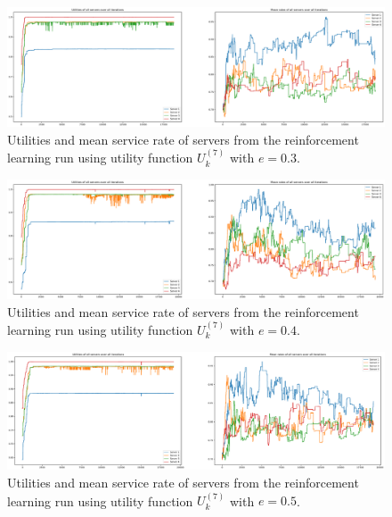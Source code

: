 \begin{figure}[H]
    \includegraphics[width=\textwidth]{chapters/00_appendix/03_more_rl_results/Bin/utility_7_eps/u7_1_e03.eps}
    \caption{Utilities and mean service rate of servers from the reinforcement
    learning run using utility function \(U_k^{(7)}\) with \(e = 0.3\).}
    \label{fig:RL_utility7_1_e03}
\end{figure}


\begin{figure}[H]
    \includegraphics[width=\textwidth]{chapters/00_appendix/03_more_rl_results/Bin/utility_7_eps/u7_1_e04.eps}
    \caption{Utilities and mean service rate of servers from the reinforcement
    learning run using utility function \(U_k^{(7)}\) with \(e = 0.4\).}
    \label{fig:RL_utility7_1_e04}
\end{figure}


\begin{figure}[H]
    \includegraphics[width=\textwidth]{chapters/00_appendix/03_more_rl_results/Bin/utility_7_eps/u7_1_e05.eps}
    \caption{Utilities and mean service rate of servers from the reinforcement
    learning run using utility function \(U_k^{(7)}\) with \(e = 0.5\).}
    \label{fig:RL_utility7_1_e05}
\end{figure}


